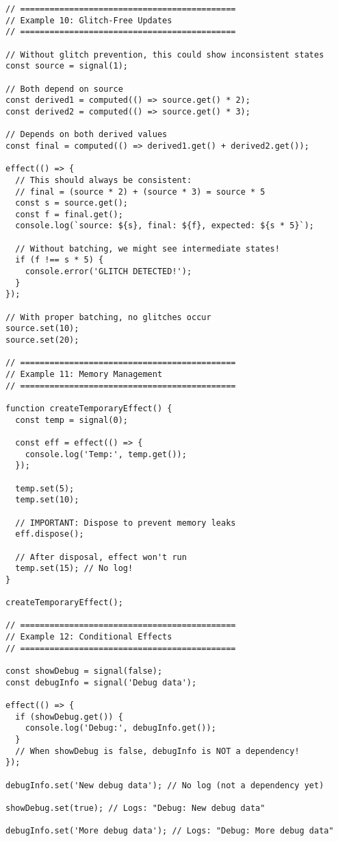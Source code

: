 \documentclass[11pt]{article}
\begin{document}
\begin{verbatim}
// ============================================
// Example 10: Glitch-Free Updates
// ============================================

// Without glitch prevention, this could show inconsistent states
const source = signal(1);

// Both depend on source
const derived1 = computed(() => source.get() * 2);
const derived2 = computed(() => source.get() * 3);

// Depends on both derived values
const final = computed(() => derived1.get() + derived2.get());

effect(() => {
  // This should always be consistent:
  // final = (source * 2) + (source * 3) = source * 5
  const s = source.get();
  const f = final.get();
  console.log(`source: ${s}, final: ${f}, expected: ${s * 5}`);
  
  // Without batching, we might see intermediate states!
  if (f !== s * 5) {
    console.error('GLITCH DETECTED!');
  }
});

// With proper batching, no glitches occur
source.set(10);
source.set(20);

// ============================================
// Example 11: Memory Management
// ============================================

function createTemporaryEffect() {
  const temp = signal(0);
  
  const eff = effect(() => {
    console.log('Temp:', temp.get());
  });
  
  temp.set(5);
  temp.set(10);
  
  // IMPORTANT: Dispose to prevent memory leaks
  eff.dispose();
  
  // After disposal, effect won't run
  temp.set(15); // No log!
}

createTemporaryEffect();

// ============================================
// Example 12: Conditional Effects
// ============================================

const showDebug = signal(false);
const debugInfo = signal('Debug data');

effect(() => {
  if (showDebug.get()) {
    console.log('Debug:', debugInfo.get());
  }
  // When showDebug is false, debugInfo is NOT a dependency!
});

debugInfo.set('New debug data'); // No log (not a dependency yet)

showDebug.set(true); // Logs: "Debug: New debug data"

debugInfo.set('More debug data'); // Logs: "Debug: More debug data"


\end{verbatim}
\end{document}
